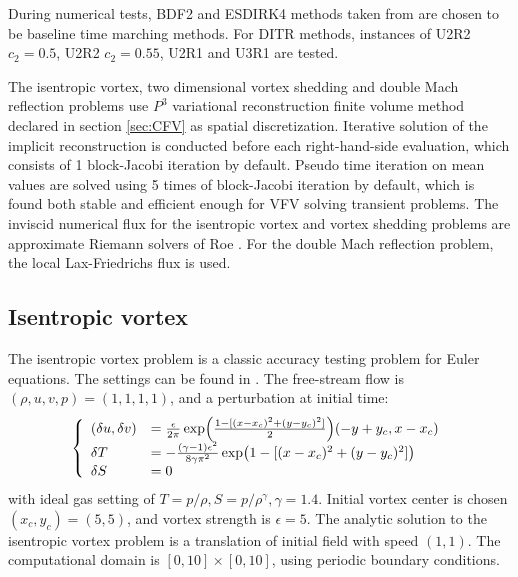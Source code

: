 During numerical tests,
BDF2 and ESDIRK4 methods taken from
\cite{kennedy2003additiveARK,bijl2002implicitBDFvESDIRK}
are chosen to be
baseline time marching methods.
For DITR methods, instances of
U2R2 $c_2 = 0.5$, U2R2 $c_2 = 0.55$, U2R1 and U3R1 are tested.

The isentropic vortex, two dimensional vortex shedding
and  double Mach reflection problems use
$P^3$ variational reconstruction finite volume method declared in
section \ref{sec:CFV} as spatial  discretization.
Iterative solution of the implicit reconstruction
is conducted before each right-hand-side evaluation,
which consists of 1 block-Jacobi iteration by default.
Pseudo time iteration on mean values are
solved using 5 times of block-Jacobi iteration by default,
which is found both stable and efficient enough for VFV solving
transient problems.
The inviscid numerical flux for the 
isentropic vortex and vortex shedding 
problems are approximate Riemann solvers 
of Roe \cite{roe1981approximate}.  
For the double Mach reflection problem, 
the local Lax-Friedrichs flux is used.

\subsection{Isentropic vortex}
\label{ssec:resultIV}

The isentropic vortex problem is a classic
accuracy testing problem for Euler equations.
The settings can be found in \cite{hu1999weighted_WENO}.
The free-stream flow is $(\rho,u,v,p)=(1,1,1,1)$,
and a perturbation at initial time:
\begin{equation}
    \left\{
    \begin{array}[2]{ll}
        (\delta u, \delta v) & = \frac{\epsilon}{2\pi}\exp(\frac{1-[(x-x_c)^2+(y-y_c)^2]}{2})(-y+y_c,x-x_c) \\
        \delta T             & = - \frac{(\gamma-1)\epsilon^2}{8\gamma\pi^2}\exp(1-[(x-x_c)^2+(y-y_c)^2])   \\
        \delta S             & = 0                                                                          \\
    \end{array}
    \right.
\end{equation}
with ideal gas setting of $T = p/\rho, S= p/\rho^\gamma, \gamma =1.4$.
Initial vortex center is chosen $(x_c,y_c)=(5,5)$,
and vortex strength is $\epsilon = 5$.
The analytic solution to the isentropic vortex problem is a
translation of initial field with speed $(1,1)$.
The computational domain is $[0,10]\times[0,10]$,
using periodic boundary conditions.

